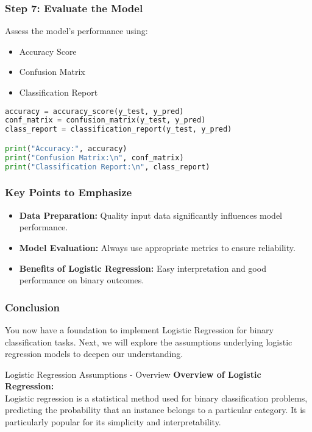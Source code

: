 \documentclass[aspectratio=169]{beamer}
\begin{document}
\begin{frame}[fragile]
    \frametitle{Step 7: Evaluate the Model}
    Assess the model's performance using:
    \begin{itemize}
        \item Accuracy Score
        \item Confusion Matrix
        \item Classification Report
    \end{itemize}
    \begin{lstlisting}[language=Python]
accuracy = accuracy_score(y_test, y_pred)
conf_matrix = confusion_matrix(y_test, y_pred)
class_report = classification_report(y_test, y_pred)

print("Accuracy:", accuracy)
print("Confusion Matrix:\n", conf_matrix)
print("Classification Report:\n", class_report)
    \end{lstlisting}
\end{frame}

\begin{frame}[fragile]
    \frametitle{Key Points to Emphasize}
    \begin{itemize}
        \item \textbf{Data Preparation:} Quality input data significantly influences model performance.
        \item \textbf{Model Evaluation:} Always use appropriate metrics to ensure reliability.
        \item \textbf{Benefits of Logistic Regression:} Easy interpretation and good performance on binary outcomes.
    \end{itemize}
\end{frame}

\begin{frame}[fragile]
    \frametitle{Conclusion}
    You now have a foundation to implement Logistic Regression for binary classification tasks. 
    Next, we will explore the assumptions underlying logistic regression models to deepen our understanding.
\end{frame}

\begin{frame}[fragile]{Logistic Regression Assumptions - Overview}
  \textbf{Overview of Logistic Regression:} \\
  Logistic regression is a statistical method used for binary classification problems, predicting the probability that an instance belongs to a particular category. 
  It is particularly popular for its simplicity and interpretability.
\end{frame}
\end{document}
